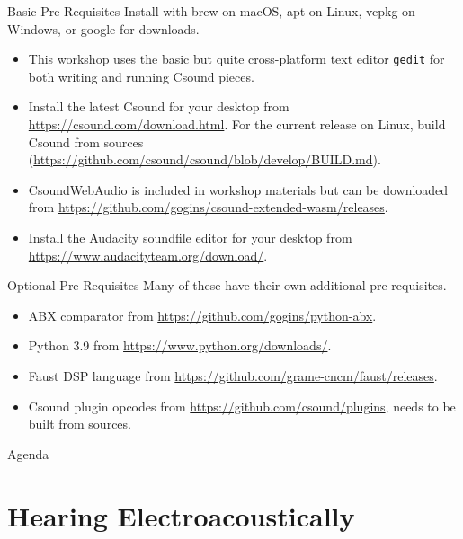 \documentclass{beamer}
\begin{document}
    \begin{frame}{Basic Pre-Requisites}
    	Install with brew on macOS, apt on Linux, vcpkg on Windows, or 
	google for downloads.
        \begin{itemize}
            \item This workshop uses the basic but quite cross-platform text editor \texttt{gedit} 
            for both writing and running Csound pieces.
            \item Install the latest Csound for your desktop from
            \url{https://csound.com/download.html}. For the current release on
            Linux, build Csound from sources 
            (\url{https://github.com/csound/csound/blob/develop/BUILD.md}).
            \item CsoundWebAudio is included in workshop materials but can be 
            downloaded from \url{https://github.com/gogins/csound-extended-wasm/releases}.
            \item Install the Audacity soundfile editor for your desktop from
            \url{https://www.audacityteam.org/download/}.
        \end{itemize}
    \end{frame}
    
    \begin{frame}{Optional Pre-Requisites}
        Many of these have their own additional pre-requisites. 
        \begin{itemize}
            \item ABX comparator from \url{https://github.com/gogins/python-abx}.
            \item Python 3.9 from \url{https://www.python.org/downloads/}.
            \item Faust DSP language from
            \url{https://github.com/grame-cncm/faust/releases}.
            \item Csound plugin opcodes from
            \url{https://github.com/csound/plugins}, needs to be built from sources.
        \end{itemize}
    \end{frame}
    
    \begin{frame}{Agenda}
        \tableofcontents
    \end{frame}
    
    \section{Hearing Electroacoustically}
    
\end{document}

